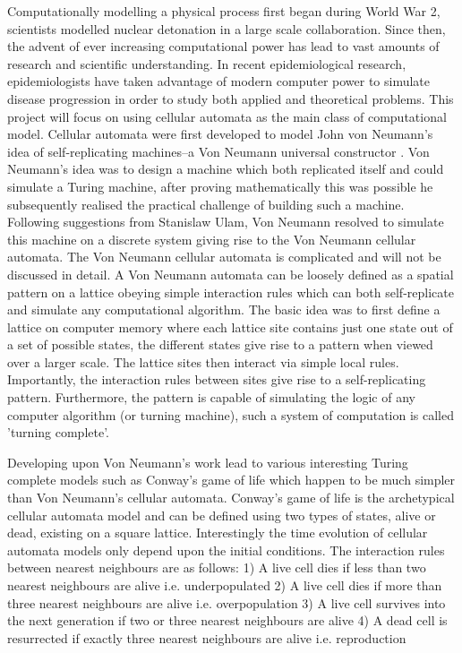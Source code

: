 Computationally modelling a physical process first began during World War 2, scientists modelled nuclear detonation in a large scale collaboration. Since then, the advent of ever increasing computational power has lead to vast amounts of research and scientific understanding. In recent epidemiological research, epidemiologists have taken advantage of modern computer power to simulate disease progression in order to study both applied and theoretical problems. This project will focus on using cellular automata as the main class of computational model. Cellular automata were first developed to model John von Neumann's idea of self-replicating machines\---a Von Neumann universal constructor \cite{NEUMANN_MACHINE}. Von Neumann's idea was to design a machine which both replicated itself and could simulate a Turing machine, after proving mathematically this was possible he subsequently realised the practical challenge of building such a machine. Following suggestions from Stanislaw Ulam, Von Neumann resolved to simulate this machine on a discrete system giving rise to the Von Neumann cellular automata. The Von Neumann cellular automata is complicated and will not be discussed in detail. A Von Neumann automata can be loosely defined as a spatial pattern on a lattice obeying simple interaction rules which can both self-replicate and simulate any computational algorithm. The basic idea was to first define a lattice on computer memory where each lattice site contains just one state out of a set of possible states, the different states give rise to a pattern when viewed over a larger scale. The lattice sites then interact via simple local rules. Importantly, the interaction rules between sites give rise to a self-replicating pattern. Furthermore, the pattern is capable of simulating the logic of any computer algorithm (or turning machine), such a system of computation is called 'turning complete'.

Developing upon Von Neumann's work lead to various interesting Turing complete models such as Conway's game of life which happen to be much simpler than Von Neumann's cellular automata. Conway's game of life is the archetypical cellular automata model and can be defined using two types of states, alive or dead, existing on a square lattice. Interestingly the time evolution of cellular automata models only depend upon the initial conditions. The interaction rules between nearest neighbours are as follows: 1) A live cell dies if less than two nearest neighbours are alive i.e. underpopulated 2) A live cell dies if more than three nearest neighbours are alive i.e. overpopulation 3) A live cell survives into the next generation if two or three nearest neighbours are alive 4) A dead cell is resurrected if exactly three nearest neighbours are alive i.e. reproduction

